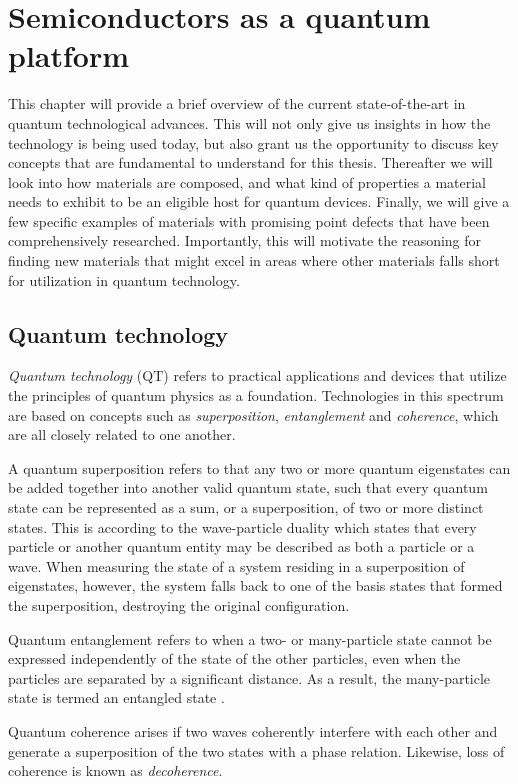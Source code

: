 \chapter{Semiconductors as a quantum platform}

This chapter will provide a brief overview of the current state-of-the-art in quantum technological advances. This will not only give us insights in how the technology is being used today, but also grant us the opportunity to discuss key concepts that are fundamental to understand for this thesis. Thereafter we will look into how materials are composed, and what kind of properties a material needs to exhibit to be an eligible host for quantum devices. Finally, we will give a few specific examples of materials with promising point defects that have been comprehensively researched. Importantly, this will motivate the reasoning for finding new materials that might excel in areas where other materials falls short for utilization in quantum technology.

\section{Quantum technology}
\textit{Quantum technology} (QT) refers to practical applications and devices that utilize the principles of quantum physics as a foundation. Technologies in this spectrum are based on concepts such as \textit{superposition}, \textit{entanglement} and \textit{coherence}, which are all closely related to one another.

A quantum superposition refers to that any two or more quantum eigenstates can be added together into another valid quantum state, such that every quantum state can be represented as a sum, or a superposition, of two or more distinct states. This is according to the wave-particle duality which states that every particle or another quantum entity may be described as both a particle or a wave. When measuring the state of a system residing in a superposition of eigenstates, however, the system falls back to one of the basis states that formed the superposition, destroying the original configuration.

Quantum entanglement refers to when a two- or many-particle state cannot be expressed independently of the state of the other particles, even when the particles are separated by a significant distance. As a result, the many-particle state is termed an entangled state \cite{Griffiths2017}.

Quantum coherence arises if two waves coherently interfere with each other and generate a superposition of the two states with a phase relation. Likewise, loss of coherence is known as \textit{decoherence}.


